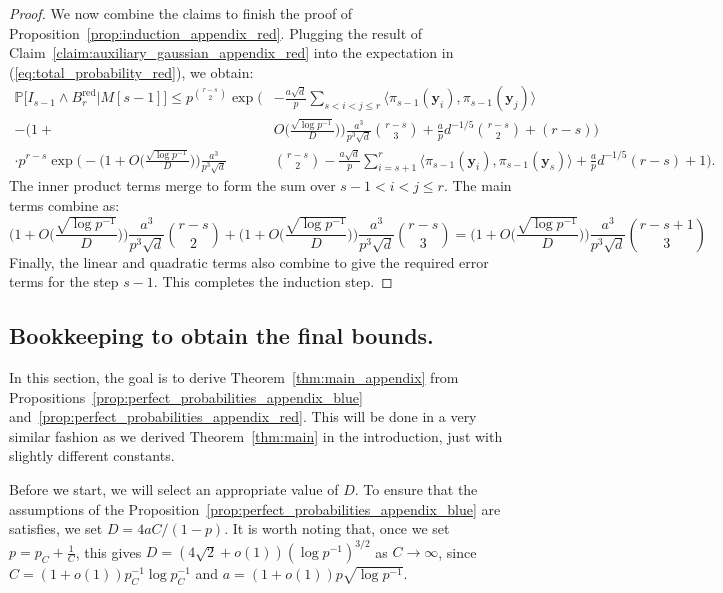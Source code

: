 \documentclass[11pt]{amsart}
\theoremstyle{definition}
\def\Pb{\mathbb{P}}
\def\by{\boldsymbol{y}}
\DeclareMathOperator{\red}{red}
\begin{document}
\begin{proof}
We now combine the claims to finish the proof of Proposition~\ref{prop:induction_appendix_red}. Plugging the result of Claim~\ref{claim:auxiliary_gaussian_appendix_red} into the expectation in (\ref{eq:total_probability_red}), we obtain:
{\smaller[0.3]
\begin{align*}
\Pb\Big[I_{s-1}\wedge B^{\red}_r\Big| M[s-1]\Big] \leq p^{\binom{r-s}{2}} \exp\bigg( &- \frac{a\sqrt{d}}{p} \sum_{s<i<j\leq r} \langle \pi_{s-1}(\by_i), \pi_{s-1}(\by_j) \rangle  \\
- \Big(1+&O\big( \frac{\sqrt{\log p^{-1}}}{D}\big)\Big) \frac{a^3}{p^3\sqrt{d}}\binom{r-s}{3} +\frac{a}{p}d^{-1/5}\binom{r-s}{2}+(r-s) \bigg) \\
 \cdot p^{r-s} \exp\bigg(\!\! -\!\! \Big(1\!+\!O\big(\! \frac{\sqrt{\log p^{-1}}}{D}\big)\!\Big)\frac{a^3}{p^3\sqrt{d}}&\binom{r\!-\!s}{2} \! -\!\frac{a\sqrt{d}}{p} \!\!\!\sum_{i=s+1}^r\!\! \langle \pi_{s-1}(\by_i), \pi_{s-1}(\by_s) \rangle \!+\!\frac{a}{p}d^{-1/5}(r\!-\!s)\!+\!1\!\bigg).
\end{align*}
}
The inner product terms merge to form the sum over $s-1<  i < j \le r$. The main terms combine as:
{\smaller[0.3]
\[ \Big(1+O\big( \frac{\sqrt{\log p^{-1}}}{D}\big)\Big)\frac{a^3}{p^3\sqrt{d}}\binom{r\!-\!s}{2}+ \Big(1+O\big( \frac{\sqrt{\log p^{-1}}}{D}\big)\Big) \frac{a^3}{p^3\sqrt{d}}\binom{r\!-\!s}{3}\!=\!\Big(1+O\big( \frac{\sqrt{\log p^{-1}}}{D}\big)\Big) \frac{a^3}{p^3\sqrt{d}}\binom{r\!-\!s\!+\!1}{3}\]
}
Finally, the linear and quadratic terms also combine to give the required error terms for the step $s-1$. This completes the induction step.
\end{proof}

\subsection{Bookkeeping to obtain the final bounds.}

In this section, the goal is to derive Theorem~\ref{thm:main_appendix} from Propositions~\ref{prop:perfect_probabilities_appendix_blue} and~\ref{prop:perfect_probabilities_appendix_red}. This will be done in a very similar fashion as we derived Theorem~\ref{thm:main} in the introduction, just with slightly different constants.

Before we start, we will select an appropriate value of $D$. To ensure that the assumptions of the Proposition~\ref{prop:perfect_probabilities_appendix_blue} are satisfies, we set $D= 4aC/(1-p)$. It is worth noting that, once we set $p=p_C+\frac{1}{C}$, this gives $D=(4\sqrt{2}+o(1))(\log p^{-1})^{3/2}$ as $C\to\infty$, since $C=(1+o(1))p_C^{-1} \log p_C^{-1}$ and $a=(1+o(1))p\sqrt{\log p^{-1}}$.
\end{document}
